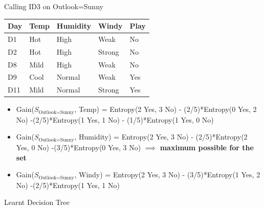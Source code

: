 \documentclass[usenames,dvipsnames]{beamer}
\begin{document}
	\begin{frame}{Calling ID3 on Outlook=Sunny}
\begin{tabular}{llll||l} \toprule
	\textbf{Day} & \textbf{Temp} & \textbf{Humidity} & \textbf{Windy}  & \textbf{Play} \\ \midrule
	D1    & Hot  & High     & Weak   & No   \\
	D2     & Hot  & High     & Strong & No   \\
	D8     & Mild & High     & Weak   & No   \\
	D9    & Cool & Normal   & Weak   & Yes  \\
	D11    & Mild & Normal   & Strong & Yes  \\ \bottomrule
\end{tabular}

\begin{itemize}
	\pause \item Gain($S_{\text{Outlook=Sunny}}$, Temp) = Entropy(2 Yes, 3 No) - (2/5)*Entropy(0 Yes, 2 No) -(2/5)*Entropy(1 Yes, 1 No) - (1/5)*Entropy(1 Yes, 0 No) 
	\pause \item Gain($S_{\text{Outlook=Sunny}}$, Humidity) = Entropy(2 Yes, 3 No) - (2/5)*Entropy(2 Yes, 0 No) -(3/5)*Entropy(0 Yes, 3 No) $\implies$ \textbf{maximum possible for the set}
	\pause \item Gain($S_{\text{Outlook=Sunny}}$, Windy) = Entropy(2 Yes, 3 No) - (3/5)*Entropy(1 Yes, 2 No) -(2/5)*Entropy(1 Yes, 1 No) 
\end{itemize}
\end{frame}

\begin{frame}{Learnt Decision Tree}

\end{frame}
\end{document}
